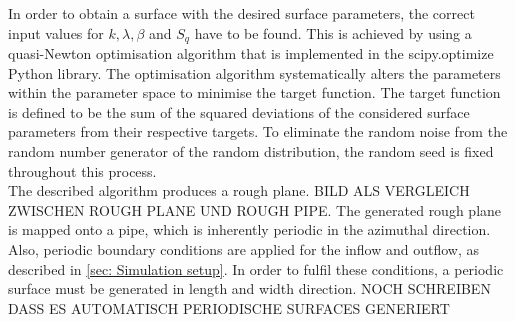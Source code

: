 In order to obtain a surface with the desired surface parameters, the correct input values for $k, \lambda, \beta$ and $S_q$ have to be found.
This is achieved by using a quasi-Newton optimisation algorithm that is implemented in the scipy.optimize Python library.
The optimisation algorithm systematically alters the parameters within the parameter space to minimise the target function.
The target function is defined to be the sum of the squared deviations of the considered surface parameters from their respective targets.
To eliminate the random noise from the random number generator of the random distribution, the random seed is fixed throughout this process.\\
The described algorithm produces a rough plane.
BILD ALS VERGLEICH ZWISCHEN ROUGH PLANE UND ROUGH PIPE.
The generated rough plane is mapped onto a pipe, which is inherently periodic in the azimuthal direction.
Also, periodic boundary conditions are applied for the inflow and outflow, as described in \autoref{sec: Simulation setup}.
In order to fulfil these conditions, a periodic surface must be generated  in length and width direction.
NOCH SCHREIBEN DASS ES AUTOMATISCH PERIODISCHE SURFACES GENERIERT
